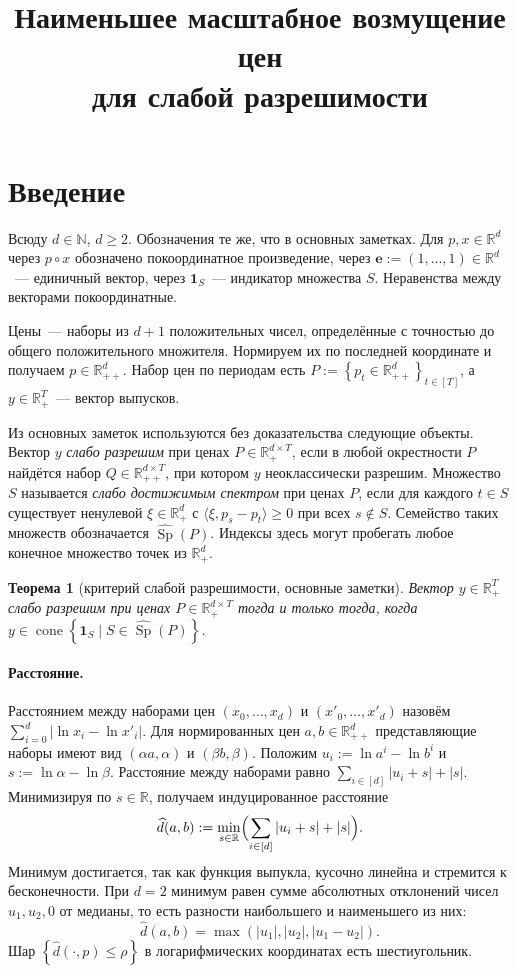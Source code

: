 \documentclass[a4paper,11pt]{article}
\title{Наименьшее масштабное возмущение цен\\ для слабой разрешимости}
\date{}
\theoremstyle{plain}
\newtheorem{theorem}{Теорема}[section]
\theoremstyle{definition}
\theoremstyle{remark}
\newcommand{\R}{\mathbb{R}}
\newcommand{\N}{\mathbb{N}}
\newcommand{\abs}[1]{\left\lvert #1 \right\rvert}
\newcommand{\set}[1]{\left\{ #1 \right\}}
\newcommand{\ip}[2]{\langle #1, #2\rangle} %
\newcommand{\Rpp}[1][2]{\R^{#1}_{++}} %
\newcommand{\Rp}[1][2]{\R^{#1}_{+}}   %
\DeclareMathOperator{\cone}{cone}
\DeclareMathOperator{\Sp}{Sp}
\newcommand{\dd}{\widehat d}
\begin{document}
\maketitle

\section{Введение}

Всюду $d\in\N$, $d\ge2$. Обозначения те же, что в основных заметках. Для $p,x\in\R^d$ через $p\circ x$ обозначено покоординатное произведение, через $\mathbf e:=(1,\dots,1)\in\R^d$~--- единичный вектор, через $\mathbf 1_S$~--- индикатор множества $S$. Неравенства между векторами покоординатные.

Цены~--- наборы из $d+1$ положительных чисел, определённые с точностью до общего положительного множителя. Нормируем их по последней координате и получаем $p\in\Rpp[d]$. Набор цен по периодам есть $P:=\set{p_t\in\Rpp[d]}_{t\in[T]}$, а $y\in\Rp[T]$~--- вектор выпусков.

Из основных заметок используются без доказательства следующие объекты. Вектор $y$ \textit{слабо разрешим} при ценах $P\in\Rp[d\times T]$, если в любой окрестности $P$ найдётся набор $Q\in\Rpp[d\times T]$, при котором $y$ неоклассически разрешим. Множество $S$ называется \textit{слабо достижимым спектром} при ценах $P$, если для каждого $t\in S$ существует ненулевой $\xi\in\Rp[d]$ с $\ip{\xi}{p_s-p_t}\ge0$ при всех $s\notin S$. Семейство таких множеств обозначается $\widehat{\Sp}(P)$. Индексы здесь могут пробегать любое конечное множество точек из $\Rp[d]$.

\begin{theorem}[критерий слабой разрешимости, основные заметки]\label{thm:closure}
    Вектор $y\in\Rp[T]$ слабо разрешим при ценах $P\in\Rp[d\times T]$ тогда и только тогда, когда $y\in\cone\set{\mathbf 1_S\mid S\in\widehat{\Sp}(P)}$.
\end{theorem}

\paragraph{Расстояние.}
Расстоянием между наборами цен $(x_0,\dots,x_d)$ и $(x'_0,\dots,x'_d)$ назовём $\sum_{i=0}^d\abs{\ln x_i-\ln x'_i}$. Для нормированных цен $a,b\in\Rpp[d]$ представляющие наборы имеют вид $(\alpha a,\alpha)$ и $(\beta b,\beta)$. Положим $u_i:=\ln a^i-\ln b^i$ и $s:=\ln\alpha-\ln\beta$. Расстояние между наборами равно $\sum_{i\in[d]}\abs{u_i+s}+\abs{s}$. Минимизируя по $s\in\R$, получаем индуцированное расстояние
\[
    \dd(a,b):=\min_{s\in\R}\Bigl(\sum_{i\in[d]}\abs{u_i+s}+\abs{s}\Bigr).
\]
Минимум достигается, так как функция выпукла, кусочно линейна и стремится к бесконечности. При $d=2$ минимум равен сумме абсолютных отклонений чисел $u_1,u_2,0$ от медианы, то есть разности наибольшего и наименьшего из них:
\[
    \dd(a,b)=\max(\abs{u_1},\abs{u_2},\abs{u_1-u_2}).
\]
Шар $\set{\dd(\cdot,p)\le\rho}$ в логарифмических координатах есть шестиугольник.
\end{document}
